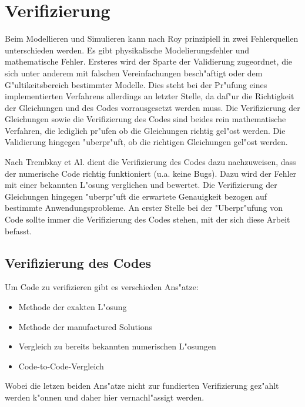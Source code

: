 \newpage
\chapter{Verifizierung}
Beim Modellieren und Simulieren kann nach Roy \cite{roy} prinzipiell in zwei Fehlerquellen unterschieden werden. Es gibt physikalische Modelierungsfehler und mathematische Fehler. Ersteres wird der Sparte der Validierung zugeordnet, die sich unter anderem mit falschen Vereinfachungen besch"aftigt oder dem G"ultikeitsbereich bestimmter Modelle. Dies steht bei der Pr"ufung eines implementierten Verfahrens allerdings an letzter Stelle, da daf"ur die Richtigkeit der Gleichungen und des Codes vorrausgesetzt werden muss.
Die Verifizierung der Gleichungen sowie die Verifizierung des Codes sind beides rein mathematische Verfahren, die lediglich pr"ufen ob die Gleichungen richtig gel"ost werden. Die Validierung hingegen "uberpr"uft, ob die richtigen Gleichungen gel"ost werden\cite{tremblay}.

Nach Trembkay et Al. \cite{tremblay} dient die Verifizierung des Codes dazu nachzuweisen, dass der numerische Code richtig funktioniert (u.a. keine Bugs). Dazu wird der Fehler mit einer bekannten L"osung verglichen und bewertet. Die Verifizierung der Gleichungen hingegen "uberpr"uft die erwartete Genauigkeit bezogen auf bestimmte Anwendungsprobleme. An erster Stelle bei der "Uberpr"ufung von Code sollte immer die Verifizierung des Codes stehen, mit der sich diese Arbeit befasst.


\section{Verifizierung des Codes}
Um Code zu verifizieren gibt es verschieden Ans"atze:
\begin{itemize}
	\item Methode der exakten L"osung
	\item Methode der manufactured Solutions
	\item Vergleich zu bereits bekannten numerischen L"osungen
	\item Code-to-Code-Vergleich
\end{itemize}
Wobei die letzen beiden Ans"atze nicht zur fundierten Verifizierung gez"ahlt werden k"onnen\cite{roy} und daher hier vernachl"assigt werden.

